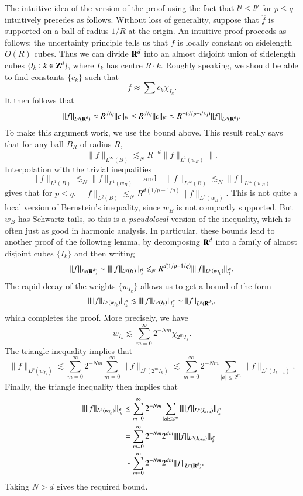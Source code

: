 The intuitive idea of the version of the proof using the fact that $l^q \leq l^p$ for $p \leq q$ intuitively precedes as follows. Without loss of generality, suppose that $\widehat{f}$ is supported on a ball of radius $1/R$ at the origin. An intuitive proof proceeds as follows: the uncertainty principle tells us that $f$ is locally constant on sidelength $O(R)$ cubes. Thus we can divide $\operatorname{\mathbf{R}}^d$ into an almost disjoint union of sidelength  cubes $\{ I_k : k \in \operatorname{\mathbf{Z}}^d \}$, where $I_k$ has centre $R \cdot k$. Roughly speaking, we should be able to find constants $\{ c_k \}$ such that
%
\[ f \approx \sum c_k \chi_{I_k}. \]
%
It then follows that
%
\[ \| f \|_{L^q(\operatorname{\mathbf{R}}^d)} \approx R^{d/q} \| c \|_{l^q} \leq R^{d/q} \| c \|_{l^p} \approx R^{-(d/p - d/q)} \| f \|_{L^p(\operatorname{\mathbf{R}}^d)}.  \]
%
To make this argument work, we use the bound above. This result really says that for any ball $B_R$ of radius $R$,
%
\[ \| f \|_{L^\infty(B)} \lesssim_N R^{-d} \| f \|_{L^1(w_B)} \|. \]
%
Interpolation with the trivial inequalities
%
\[ \| f \|_{L^1(B)} \lesssim_N \| f \|_{L^1(w_B)} \quad\text{and}\quad \| f \|_{L^\infty(B)} \lesssim_N \| f \|_{L^\infty(w_B)} \]
%
gives that for $p \leq q$, $\| f \|_{L^q(B)} \lesssim_N R^{d(1/p-1/q)} \| f \|_{L^p(w_B)}$. This is not quite a local version of Bernstein's inequality, since $w_B$ is not compactly supported. But $w_B$ has Schwartz tails, so this is a \emph{pseudolocal} version of the inequality, which is often just as good in harmonic analysis. In particular, these bounds lead to another proof of the following lemma, by decomposing $\operatorname{\mathbf{R}}^d$ into a family of almost disjoint cubes $\{ I_k \}$ and then writing
%
\[ \| f \|_{L^q(\operatorname{\mathbf{R}}^d)} \sim \| \| f \|_{L^q(I_k)} \|_{l^q_k} \lesssim_N R^{d(1/p-1/q)} \| \| f \|_{L^p(w_{I_k})} \|_{l^p_k}. \]
%
The rapid decay of the weights $\{ w_{I_k} \}$ allows us to get a bound of the form
%
\[ \| \| f \|_{L^p(w_{I_k})} \|_{l^p_k} \lesssim \| \| f \|_{L^p(I_k)} \|_{l^p_k} \sim \| f \|_{L^p(\operatorname{\mathbf{R}}^d)}, \]
%
which completes the proof. More precisely, we have
%
\[ w_{I_k} \lesssim \sum_{m = 0}^\infty 2^{-Nm} \chi_{2^m I_k}. \]
%
The triangle inequality implies that
%
\[ \| f \|_{L^p(w_{I_k})} \lesssim \sum_{m = 0}^\infty 2^{-Nm} \sum_{m = 0}^\infty \| f \|_{L^p(2^m I_k)} \lesssim \sum_{m = 0}^\infty 2^{-Nm} \sum_{|a| \leq 2^m} \| f \|_{L^p(I_{k + a})}. \]
%
Finally, the triangle inequality then implies that
%
\begin{align*}
    \| \| f \|_{L^p(w_{I_k})} \|_{l^p_k} &\leq \sum_{m = 0}^\infty 2^{-Nm} \sum_{|a| \leq 2^m} \|  \| f \|_{L^p(I_{k+a})} \|_{l^p_k}\\
    &= \sum_{m = 0}^\infty 2^{-Nm} 2^{dm} \|  \| f \|_{L^p(I_{k+a})} \|_{l^p_k}\\
    &\sim \sum_{m = 0}^\infty 2^{-Nm} 2^{dm} \| f \|_{L^p(\operatorname{\mathbf{R}}^d)}.
\end{align*}
%
Taking $N > d$ gives the required bound.

